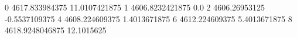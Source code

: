 0 4617.833984375 11.0107421875
1 4606.8232421875 0.0
2 4606.26953125 -0.5537109375
4 4608.224609375 1.4013671875
6 4612.224609375 5.4013671875
8 4618.9248046875 12.1015625
